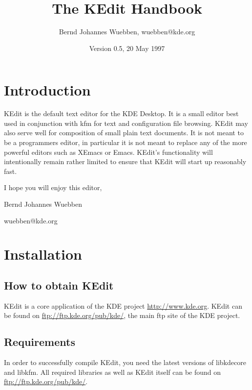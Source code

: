 \documentclass{article}
\title{The KEdit Handbook}
\author{Bernd Johannes Wuebben, {\ttfamily wuebben@kde.org}}
\date{Version 0.5, 20 May 1997}
\begin{document}
\maketitle
\tableofcontents

\section{Introduction}

KEdit is the default text editor for the KDE Desktop. It is a small editor best used
in conjunction with kfm for text and configuration file browsing. KEdit may also serve
well for composition of small plain text documents. It is not meant
to be a programmers editor, in particular it is not meant to replace any of the
more powerful editors such as XEmacs or Emacs. KEdit's functionality will intentionally
remain rather limited to ensure that KEdit will start  up reasonably fast.

I hope you will enjoy this editor,

{\ttfamily Bernd Johannes Wuebben}

wuebben@kde.org






\section{Installation}




\subsection{How to obtain KEdit}

KEdit is a core application of the KDE project \url{http://www.kde.org}{}.
KEdit can be found on \url{ftp://ftp.kde.org/pub/kde/}{}, the main ftp site
of the KDE project.




\subsection{Requirements}

In order to successfully compile KEdit, you need the latest versions of {\ttfamily  libkdecore}
and {\ttfamily  libkfm}. All required libraries as well as KEdit itself can be found
on \url{ftp://ftp.kde.org/pub/kde/}{}. 
\end{document}
